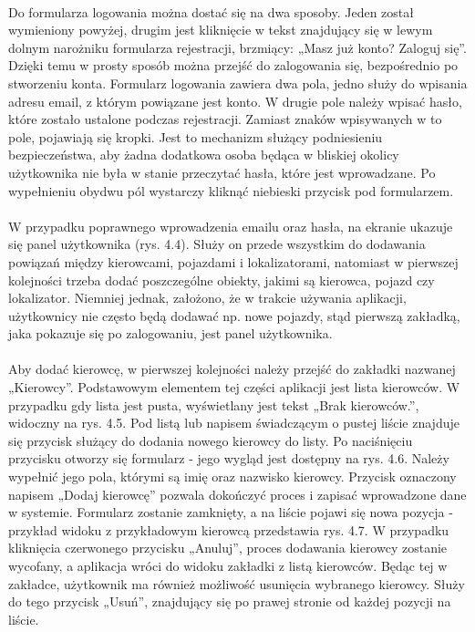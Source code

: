 \paragraph{}
Do formularza logowania można dostać się na dwa sposoby. Jeden został wymieniony powyżej, drugim jest kliknięcie w tekst znajdujący się w lewym dolnym narożniku formularza rejestracji, brzmiący: „Masz już konto? Zaloguj się”. Dzięki temu w prosty sposób można przejść do zalogowania się, bezpośrednio po stworzeniu konta. Formularz logowania zawiera dwa pola, jedno służy do wpisania adresu email, z którym powiązane jest konto. W drugie pole należy wpisać hasło, które zostało ustalone podczas rejestracji. Zamiast znaków wpisywanych w to pole, pojawiają się kropki. Jest to mechanizm służący podniesieniu bezpieczeństwa, aby żadna dodatkowa osoba będąca w bliskiej okolicy użytkownika nie była w stanie przeczytać hasła, które jest wprowadzane. Po wypełnieniu obydwu pól wystarczy kliknąć niebieski przycisk pod formularzem.

\paragraph{}
W przypadku poprawnego wprowadzenia emailu oraz hasła, na ekranie ukazuje się panel użytkownika (rys. 4.4). Służy on przede wszystkim do dodawania powiązań między kierowcami, pojazdami i lokalizatorami, natomiast w pierwszej kolejności trzeba dodać poszczególne obiekty, jakimi są kierowca, pojazd czy lokalizator. Niemniej jednak, założono, że w trakcie używania aplikacji, użytkownicy nie często będą dodawać np. nowe pojazdy, stąd pierwszą zakładką, jaka pokazuje się po zalogowaniu, jest panel użytkownika. 

\paragraph{}
Aby dodać kierowcę, w pierwszej kolejności należy przejść do zakładki nazwanej „Kierowcy”. Podstawowym elementem tej części aplikacji jest lista kierowców. W przypadku gdy lista jest pusta, wyświetlany jest tekst „Brak kierowców.”, widoczny na rys. 4.5. Pod listą lub napisem świadczącym o pustej liście znajduje się przycisk służący do dodania nowego kierowcy do listy. Po naciśnięciu przycisku otworzy się formularz - jego wygląd jest dostępny na rys. 4.6. Należy wypełnić jego pola, którymi są imię oraz nazwisko kierowcy. Przycisk oznaczony napisem „Dodaj kierowcę” pozwala dokończyć proces i zapisać wprowadzone dane w systemie. Formularz zostanie zamknięty, a na liście pojawi się nowa pozycja - przykład widoku z przykładowym kierowcą przedstawia rys. 4.7. W przypadku kliknięcia czerwonego przycisku „Anuluj”, proces dodawania kierowcy zostanie wycofany, a aplikacja wróci do widoku zakładki z listą kierowców. Będąc tej w zakładce, użytkownik ma również możliwość usunięcia wybranego kierowcy. Służy do tego przycisk „Usuń”, znajdujący się po prawej stronie od każdej pozycji na liście.

